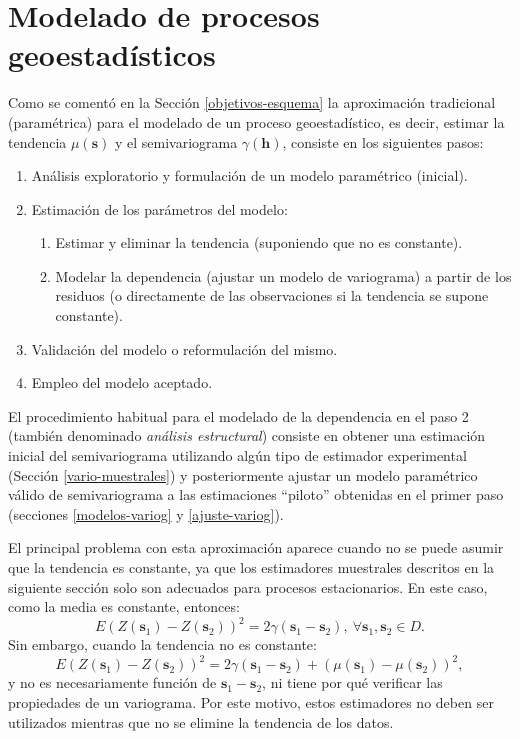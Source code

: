 \documentclass[
  spanish,
]{book}
\theoremstyle{break}
\theoremstyle{definition}
\theoremstyle{definition}
\theoremstyle{definition}
\theoremstyle{definition}
\theoremstyle{remark}
\begin{document}
\hypertarget{modelado}{%
\chapter{Modelado de procesos geoestadísticos}\label{modelado}}

Como se comentó en la Sección \ref{objetivos-esquema} la aproximación tradicional (paramétrica) para el modelado de un proceso geoestadístico, es decir, estimar la tendencia \(\mu(\mathbf{s})\) y el semivariograma \(\gamma(\mathbf{h})\), consiste en los siguientes pasos:

\begin{enumerate}
\def\labelenumi{\arabic{enumi}.}
\item
  Análisis exploratorio y formulación de un modelo paramétrico (inicial).
\item
  Estimación de los parámetros del modelo:

  \begin{enumerate}
  \def\labelenumii{\arabic{enumii}.}
  \item
    Estimar y eliminar la tendencia (suponiendo que no es constante).
  \item
    Modelar la dependencia (ajustar un modelo de variograma) a partir de los residuos
    (o directamente de las observaciones si la tendencia se supone constante).
  \end{enumerate}
\item
  Validación del modelo o reformulación del mismo.
\item
  Empleo del modelo aceptado.
\end{enumerate}

El procedimiento habitual para el modelado de la dependencia en el paso 2 (también denominado \emph{análisis estructural}) consiste en obtener una estimación inicial del semivariograma utilizando algún tipo de estimador experimental (Sección \ref{vario-muestrales}) y posteriormente ajustar un modelo paramétrico válido de semivariograma a las estimaciones ``piloto'' obtenidas en el primer paso (secciones \ref{modelos-variog} y \ref{ajuste-variog}).

El principal problema con esta aproximación aparece cuando no se puede asumir que la tendencia es constante, ya que los estimadores muestrales descritos en la siguiente sección solo son adecuados para procesos estacionarios.
En este caso, como la media es constante, entonces:
\begin{equation} 
  E(Z(\mathbf{s}_1) - Z(\mathbf{s}_{2}))^2 = 2\gamma(\mathbf{s}_1 -\mathbf{s}_{2}),
  \ \forall \mathbf{s}_1 ,\mathbf{s}_{2} \in D.
\label{eq:vario-est}
\end{equation}
Sin embargo, cuando la tendencia no es constante:
\begin{equation} 
  E(Z(\mathbf{s}_1) - Z(\mathbf{s}_{2}))^2 = 2\gamma(\mathbf{s}_1 - \mathbf{s}_{2}) 
  + \left( \mu(\mathbf{s}_1)-\mu(\mathbf{s}_{2})\right)^2,
\label{eq:vario-nest}
\end{equation}
y no es necesariamente función de \(\mathbf{s}_1 -\mathbf{s}_{2}\), ni tiene por qué verificar las propiedades de un variograma.
Por este motivo, estos estimadores no deben ser utilizados mientras que no se elimine la tendencia de los datos.
\end{document}
